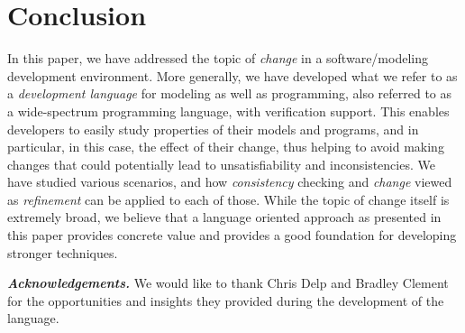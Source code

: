 
\section{Conclusion}
\label{sec:conclusion}

In this paper, we have addressed the topic of {\em change} in a
software/modeling development environment. More generally, we
have developed what we refer to as a  {\em development language} 
for modeling as well as programming, also referred to as a 
wide-spectrum programming language, with verification support. 
This enables developers to easily study properties of their models and programs, 
and in particular, in this case, the effect of their change, thus helping to
avoid making changes that could potentially lead to 
unsatisfiability
and inconsistencies. We have studied various 
scenarios, and how 
{\em consistency} checking and
{\em change} viewed as {\em refinement} can be applied
to each of those. While the topic of change itself is
extremely broad, we believe that a language oriented approach as
presented in this paper provides concrete value and provides a good
foundation for developing stronger techniques.

\noindent \textbf{\em Acknowledgements.} We would like to thank
Chris Delp and Bradley Clement for the opportunities and insights they
provided during the development of the \Klang{} language.



